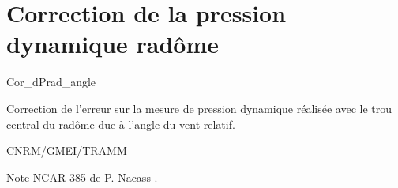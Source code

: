 
\section{Correction de la pression dynamique rad\^ome}

 {\sf Cor\_dPrad\_angle} 

Correction de l'erreur sur la mesure de pression dynamique
r\'ealis\'ee avec le trou central du rad\^ome due \`a l'angle
du vent relatif.

\bigskip





CNRM/GMEI/TRAMM

Note NCAR-385 de P. Nacass \cite{Nacass-92}.
